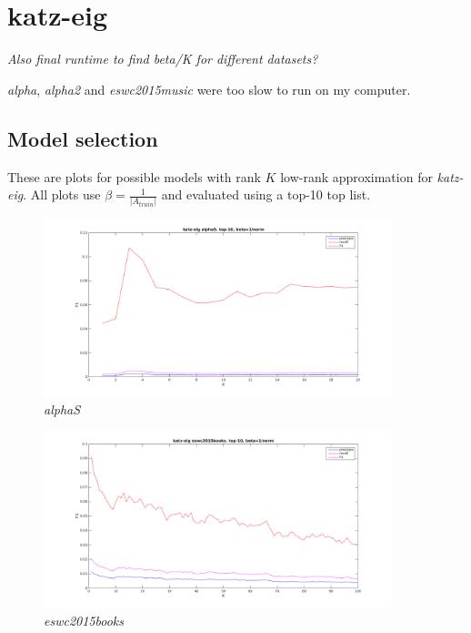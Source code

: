 
\section{katz-eig}\label{sec:graphs:katz-eig}


\textit{Also final runtime to find beta/K for different datasets?}

\textit{alpha}, \textit{alpha2} and \textit{eswc2015music} were too slow to run on my computer.


\subsection{Model selection}

These are plots for possible models with rank $K$ low-rank approximation for \textit{katz-eig}.  All plots use $\beta = \frac{1}{|A_{train}|}$ and evaluated using a top-10 top list.

\FloatBarrier

\begin{figure}[h!]
  \centering
    \includegraphics[width=0.9\textwidth]{fig/katzeig_k/alphaS_katzeig_K.png}
    \vspace{-20pt}
    \caption{\textit{alphaS}}
    \vspace{-10pt}
\end{figure}

\begin{figure}[h!]
  \centering
    \includegraphics[width=0.9\textwidth]{fig/katzeig_k/eswc2015books_katzeig_K.png}
    \vspace{-20pt}
    \caption{\textit{eswc2015books}}
    \vspace{-10pt}
\end{figure}


